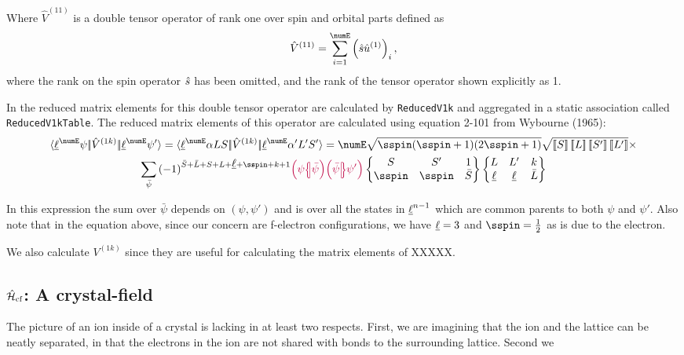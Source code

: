 \documentclass{article}
\newcommand{\codetext}[1]{{\color{BlueViolet} \texttt{#1}}}
\begin{document}
Where $\hat{V}^{(11)}$ is a double tensor operator of rank one over spin and orbital parts defined as 
\begin{equation}
    \op{V}^{(11)} = \sum_{i=1}^\numE \left( \op{s}\op{u}^{(1)} \right)_i,
\end{equation}
where the rank on the spin operator $\hat{s}$ has been omitted, and the rank of the tensor operator shown explicitly as 1.

In \qlanth the reduced matrix elements for this double tensor operator are calculated by \codetext{ReducedV1k} and aggregated in a static association called \codetext{ReducedV1kTable}. The reduced matrix elements of this operator are calculated using equation 2-101 from Wybourne (1965):
\begin{multline} 
    \redbraopket{\lorb^\numE \psi}{\op{V}^{(1k)}}{\lorb^\numE \psi'} = 
        \redbraopket{\lorb^\numE \alpha L S}
            {\op{V}^{(1k)}}
            {\lorb^\numE \alpha'L'S'} =
        \numE 
            \sqrt{\sspin (\sspin + 1) (2\sspin + 1)}
            \sqrt{\tpobraket{S}\tpobraket{L}\tpobraket{S'}\tpobraket{L'}} \times \\
    \sum_{\bar{\psi}}
        \phaser{\bar{S} + \bar{L} + S + L + \lorb + \sspin + k + 1}
        \cfpinv{\psi}{\bar{\psi}}
        \cfp{\bar{\psi}}{\psi'}
        \sixj{S}     {S'}     {1}
            {\sspin} {\sspin} {\bar{S}}
        \sixj{L}     {L'}    {k}
             {\lorb} {\lorb} {\bar{L}} 
\end{multline}

In this expression the sum over $\bar{\psi}$ depends on $(\psi,\psi')$ and is over all the states in $\underbar{$\ell$}^{n-1}$ which are common parents to both $\psi$ and $\psi'$. Also note that in the equation above, since our concern are f-electron configurations, we have $\underbar{$\ell$} = 3$ and $\sspin = \frac{1}{2}$ as is due to the electron.

We also calculate $V^{(1k)}$ since they are useful for calculating the matrix elements of XXXXX.  
 
\subsection{$\hat{\mathcal{H}}_\text{cf}$: A crystal-field}

The picture of an ion inside of a crystal is lacking in at least two respects. First, we are imagining that the ion and the lattice can be neatly separated, in that the electrons in the ion are not shared with bonds to the surrounding lattice. Second we
\end{document}
